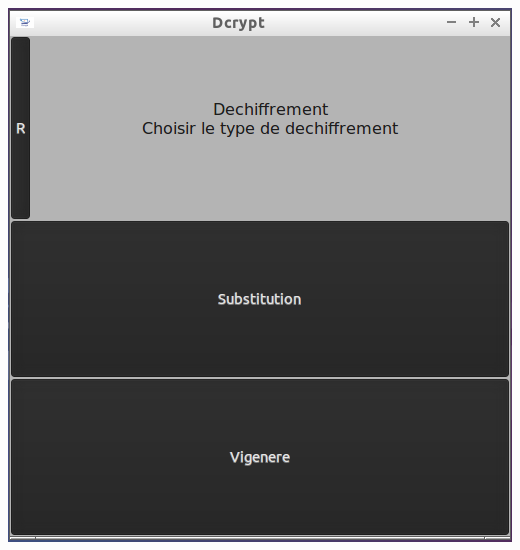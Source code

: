 \documentclass[a4]{article}
\begin{document}
		\begin{center}\includegraphics[scale=0.4]{9.png}\end{center}
		\newpage
\end{document}
